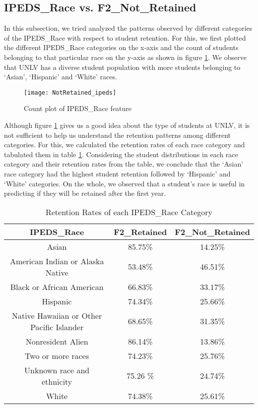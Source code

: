 \documentclass[11pt,openright]{report}
\begin{document}
\subsection {IPEDS\_Race vs. F2\_Not\_Retained}
In this subsection, we tried analyzed the patterns observed by different categories of the IPEDS\_Race with respect to student retention. For this, we first plotted the different IPEDS\_Race categories on the x-axis and the count of students belonging to that particular race on the y-axis as shown in figure \ref{fig:ipeds_F2NotRetained_plot}. We observe that UNLV has a diverse student population with more students belonging to `Asian', `Hispanic' and `White' races.


\begin{figure}[!htb]
	\centering
	\texttt{[image: NotRetained\_ipeds]}
	\caption{Count plot of IPEDS\_Race feature}
	\label{fig:ipeds_F2NotRetained_plot}
\end{figure}



Although figure \ref{fig:ipeds_F2NotRetained_plot} gives us a good idea about the type of students at UNLV, it is not sufficient to help us understand the retention patterns among different categories. For this, we calculated the retention rates of each race category and tabulated them in table \ref{table:ipeds_race_retentions}. Considering the student distributions in each race category and their retention rates from the table, we conclude that the `Asian' race category had the highest student retention followed by `Hispanic' and `White' categories. On the whole, we observed that a student's race is useful in predicting if they will be retained after the first year.

 \begin{table}[!ht]
	\renewcommand{\arraystretch}{1.3}
	\caption{Retention Rates of each IPEDS\_Race Category}
	\label{table:ipeds_race_retentions}
	\centering
	\begin{tabular}{|c|c|c|}
		\hline
		\bfseries IPEDS\_Race & \bfseries F2\_Retained & \bfseries F2\_Not\_Retained\\
		\hline
		Asian & 85.75\% & 14.25\% \\ \hline
		American Indian or Alaska Native & 53.48\% & 46.51\% \\ \hline
		Black or African American & 66.83\% & 33.17\% \\ \hline
		Hispanic & 74.34\% & 25.66\% \\ \hline
		Native Hawaiian or Other Pacific Islander & 68.65\% & 31.35\% \\ \hline
		Nonresident Alien & 86.14\% & 13.86\% \\ \hline
		Two or more races &  74.23\% &  25.76\% \\ \hline
		Unknown race and ethnicity & 75.26 \% & 24.74\% \\ \hline
		White & 74.38\% & 25.61\% \\ \hline
	\end{tabular}
\end{table}
\end{document}

